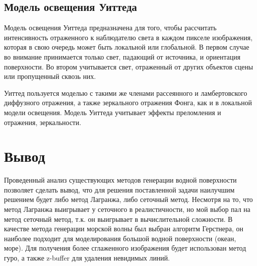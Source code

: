 \subsection*{Модель освещения Уиттеда}
Модель освещения Уиттеда предназначена для того, чтобы рассчитать интенсивность отраженного к наблюдателю света в каждом пикселе изображения, которая в свою очередь может быть локальной или глобальной. В первом случае во внимание принимается только свет, падающий от источника, и ориентация поверхности. Во втором учитывается свет, отраженный от других объектов сцены или пропущенный сквозь них.
 
Уиттед пользуется моделью с такими же членами рассеянного и ламбертовского диффузного отражения, а также зеркального отражения Фонга, как и в локальной модели освещения. Модель Уиттеда учитывает эффекты преломления и отражения, зеркальности.



\newpage
\section*{Вывод}
Проведенный анализ существующих методов генерации водной поверхности позволяет сделать вывод, что для решения поставленной задачи наилучшим решением будет либо метод Лагранжа, либо сеточный метод. Несмотря на то, что метод Лагранжа выигрывает у сеточного в реалистичности, но мой выбор пал на метод сеточный метод, т.к. он выигрывает в вычислительной сложности.
В качестве метода генерации морской волны был выбран алгоритм Герстнера, он наиболее подходит для моделирования большой водной поверхности (океан, море). Для получения более сглаженного изображения будет использован метод гуро, а также z-buffer для удаления невидимых линий.

